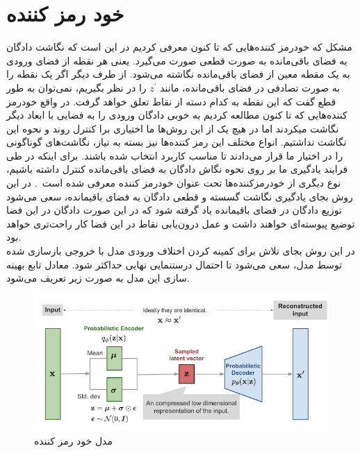 \documentclass[12pt,a4paper]{report}
\theoremstyle{definition}
\theoremstyle{definition}
\begin{document}
\section{ خود رمز کننده }
مشکل که خودرمز کننده‌هایی که تا کنون معرفی کردیم در این است که نگاشت دادگان به فضای باقی‌مانده به صورت قطعی صورت می‌گیرد. یعنی هر نقطه از فضای ورودی به یک مقطه معین از فضای باقی‌مانده نگاشته می‌شود. از طرف دیگر اگر یک نقطه را به صورت تصادفی در فضای باقی‌مانده، مانند 
$z^{'}$
 را در نظر بگیریم، نمی‌توان به طور قطع گفت که این نقطه به کدام دسته از نقاط تعلق خواهد گرفت. در واقع خودرمز کننده‌هایی که تا کنون مطالعه کردیم به خوبی دادگان ورودی را به فضایی با ابعاد دیگر نگاشت میکردند اما در هیچ یک از این روش‌ها ما اختیاری برا کنترل روند و نحوه این نگاشت نداشتیم. انواع مختلف این رمز کننده‌ها نیز بسته به نیاز، نگاشت‌های گوناگونی را در اختیار ما قرار می‌دادند تا مناسب کاربرد انتخاب شده باشند. برای اینکه در طی فرایند یادگیری ما بر روی نحوه نگاش دادگان به فضای باقی‌مانده کنترل داشته باشیم، نوع دیگری از خودرمزکننده‌ها تحت عنوان خودرمز کننده  معرفی شده است~\cite{vae}. در این روش بجای یادگیری نگاشت گسسته و قطعی دادگان به فضای باقیمانده، سعی می‌شود توزیع دادگان در فضای باقیمانده یاد گرفته شود که در این صورت دادگان در این فضا توضیع پیوسته‌ای خواهند داشت و عمل درون‌یابی نقاط در این فضا کار راحت‌تری خواهد بود.\\

در این روش بجای تلاش برای کمینه کردن اختلاف ورودی مدل با خروجی بازسازی شده توسط مدل، سعی می‌شود تا احتمال درستنمایی نهایی حداکثر شود. معادل تابع بهینه سازی این مدل به صورت زیر تعریف می‌شود.
\begin{figure}[!h]
	\begin{center}
		\includegraphics[width=\linewidth]{./images/figures/vae.png}
	\end{center}
	\caption{مدل خود رمز کننده }
	\label{fig:vae}
	\centering
\end{figure}
\end{document}
